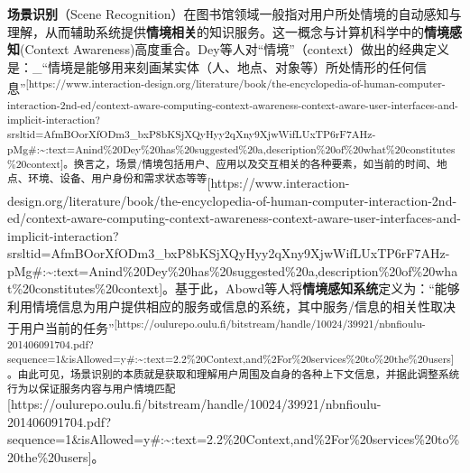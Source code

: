 \documentclass[
  letterpaper,
]{scrbook}
\begin{document}
\textbf{场景识别}（Scene
Recognition）在图书馆领域一般指对用户所处情境的自动感知与理解，从而辅助系统提供\textbf{情境相关}的知识服务。这一概念与计算机科学中的\textbf{情境感知}(Context
Awareness)高度重合。Dey等人对``情境''（context）做出的经典定义是：\_``情境是能够用来刻画某实体（人、地点、对象等）所处情形的任何信息''\textsuperscript{{[}https://www.interaction-design.org/literature/book/the-encyclopedia-of-human-computer-interaction-2nd-ed/context-aware-computing-context-awareness-context-aware-user-interfaces-and-implicit-interaction?srsltid=AfmBOorXfODm3\_bxP8bKSjXQyHyy2qXny9XjwWifLUxTP6rF7AHz-pMg\#:\textasciitilde:text=Anind\%20Dey\%20has\%20suggested\%20a,description\%20of\%20what\%20constitutes\%20context{]}。换言之，场景/情境包括用户、应用以及交互相关的各种要素，如当前的时间、地点、环境、设备、用户身份和需求状态等等}{[}https://www.interaction-design.org/literature/book/the-encyclopedia-of-human-computer-interaction-2nd-ed/context-aware-computing-context-awareness-context-aware-user-interfaces-and-implicit-interaction?srsltid=AfmBOorXfODm3\_bxP8bKSjXQyHyy2qXny9XjwWifLUxTP6rF7AHz-pMg\#:\textasciitilde:text=Anind\%20Dey\%20has\%20suggested\%20a,description\%20of\%20what\%20constitutes\%20context{]}。基于此，Abowd等人将\textbf{情境感知系统}定义为：``能够利用情境信息为用户提供相应的服务或信息的系统，其中服务/信息的相关性取决于用户当前的任务''\textsuperscript{{[}https://oulurepo.oulu.fi/bitstream/handle/10024/39921/nbnfioulu-201406091704.pdf?sequence=1\&isAllowed=y\#:\textasciitilde:text=2.2\%20Context,and\%2For\%20services\%20to\%20the\%20users{]}。由此可见，场景识别的本质就是获取和理解用户周围及自身的各种上下文信息，并据此调整系统行为以保证服务内容与用户情境匹配}{[}https://oulurepo.oulu.fi/bitstream/handle/10024/39921/nbnfioulu-201406091704.pdf?sequence=1\&isAllowed=y\#:\textasciitilde:text=2.2\%20Context,and\%2For\%20services\%20to\%20the\%20users{]}。
\end{document}
